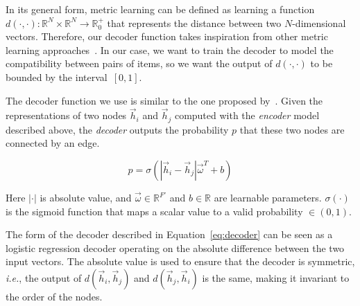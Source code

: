 \documentclass[10pt,twocolumn,letterpaper]{article}
\begin{document}
In its general form, metric learning can be defined as learning a function $d(\cdot, \cdot) : \mathbb{R}^N \times \mathbb{R}^N \rightarrow \mathbb{R}_0^+$ that represents the distance between two $N$-dimensional vectors. Therefore, our decoder function takes inspiration from other metric learning approaches~\cite{koch2015siamese, hoffer2015deep, snell2017prototypical}. In our case, we want to train the decoder to model the compatibility between pairs of items, so we want the output of $d(\cdot, \cdot)$ to be bounded by the interval~$[0,1]$. 

The decoder function we use is similar to the one proposed by~\cite{garcia2017few}. Given the representations of two nodes $\vec{h}_i$ and $\vec{h}_j$ computed with the \emph{encoder} model described above, the \emph{decoder} outputs the probability $p$ that these two nodes are connected by an edge.

\begin{equation}
    p = \sigma\left(\left|\vec{h}_i - \vec{h}_j\right| \vec{\omega}^{T} + b\right)
\label{eq:decoder}
\end{equation}

Here $\left| \cdot \right|$ is absolute value, and $\vec{\omega} \in \mathbb{R}^{F'}$ and $b \in \mathbb{R}$ are learnable parameters. $\sigma(\cdot)$ is the sigmoid function that maps a scalar value to a valid 
probability $\in (0,1)$.

The form of the decoder described in Equation~\ref{eq:decoder} can be seen as a logistic regression decoder operating on the absolute difference between the two input vectors. The absolute value is used to ensure that the decoder is symmetric, \textit{i.e.}, the output of $d(\vec{h}_i, \vec{h}_j)$ and $d(\vec{h}_j, \vec{h}_i)$ is the same, making it invariant to the order of the nodes.
\end{document}
